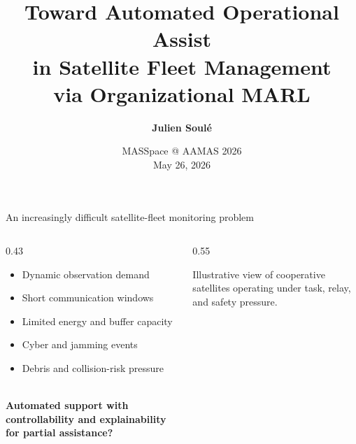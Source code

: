 \documentclass[aspectratio=169]{beamer}
\title{
Toward Automated Operational Assist \\
in Satellite Fleet Management \\
via Organizational MARL
}
\author{\textbf{Julien Soulé}}
\institute{
SEDAN Research Group -- SnT \\
University of Luxembourg
}
\date{
MASSpace @ AAMAS 2026 \\
May 26, 2026
}
\begin{document}
{
\begin{frame}
  \titlepage
\end{frame}
}

\setcounter{framenumber}{0}

\logo{}

\begin{frame}{An increasingly difficult satellite-fleet monitoring problem}

  \begin{columns}[c,totalwidth=\textwidth]
    \begin{column}{0.43\textwidth}
      \begin{itemize}
        \item Dynamic observation demand
        \item Short communication windows
        \item Limited energy and buffer capacity
        \item Cyber and jamming events
        \item Debris and collision-risk pressure
      \end{itemize}

      \vspace{0.2cm} \ \\
      \textbf{Automated support with controllability and explainability for partial assistance?}
    \end{column}
    \begin{column}{0.55\textwidth}
      \centering
      \\[0.2cm]
      {\scriptsize\linespread{0.82}\selectfont Illustrative view of cooperative satellites operating under task, relay, and safety pressure.\par}
    \end{column}
  \end{columns}

\end{frame}
\end{document}
